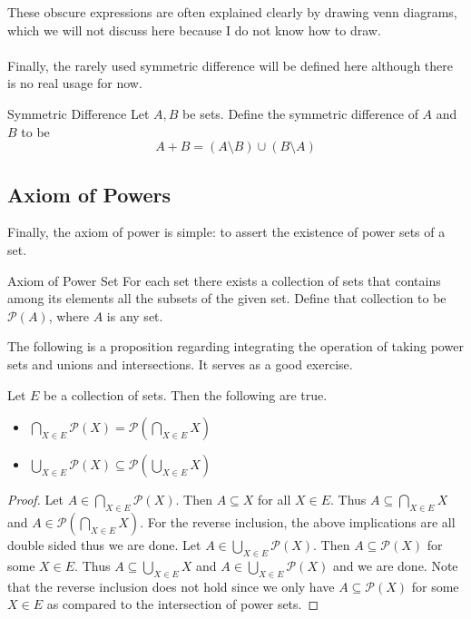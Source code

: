 These obscure expressions are often explained clearly by drawing venn diagrams, which we will not discuss here because I do not know how to draw. \\~\\

Finally, the rarely used symmetric difference will be defined here although there is no real usage for now. 

\begin{defn}{Symmetric Difference}{} Let $A,B$ be sets. Define the symmetric difference of $A$ and $B$ to be $$A+B=(A\setminus B)\cup(B\setminus A)$$
\end{defn}

\subsection{Axiom of Powers}
Finally, the axiom of power is simple: to assert the existence of power sets of a set. 

\begin{axm}{Axiom of Power Set}{} For each set there exists a collection of sets that contains among its elements all the subsets of the given set. Define that collection to be $\mathcal{P}(A)$, where $A$ is any set. 
\end{axm}

The following is a proposition regarding integrating the operation of taking power sets and unions and intersections. It serves as a good exercise. 

\begin{prp}{}{} Let $E$ be a collection of sets. Then the following are true. 
\begin{itemize}
\item $\bigcap_{X\in E}\mathcal{P}(X)=\mathcal{P}(\bigcap_{X\in E}X)$
\item $\bigcup_{X\in E}\mathcal{P}(X)\subseteq\mathcal{P}(\bigcup_{X\in E}X)$
\end{itemize}\tcbline
\begin{proof}
Let $A\in\bigcap_{X\in E}\mathcal{P}(X)$. Then $A\subseteq X$ for all $X\in E$. Thus $A\subseteq\bigcap_{X\in E}X$ and $A\in\mathcal{P}(\bigcap_{X\in E}X)$. For the reverse inclusion, the above implications are all double sided thus we are done. \linebreak\linebreak
Let $A\in\bigcup_{X\in E}\mathcal{P}(X)$. Then $A\subseteq\mathcal{P}(X)$ for some $X\in E$. Thus $A\subseteq\bigcup_{X\in E}X$ and $A\in\bigcup_{X\in E}\mathcal{P}(X)$ and we are done. Note that the reverse inclusion does not hold since we only have $A\subseteq\mathcal{P}(X)$ for some $X\in E$ as compared to the intersection of power sets. 
\end{proof}
\end{prp}


